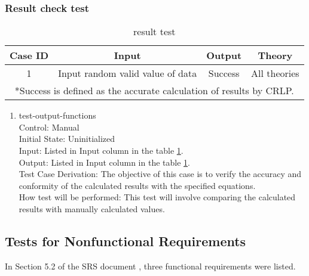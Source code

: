 \documentclass[12pt, titlepage]{article}
\begin{document}
\subsubsection{Result check test}

\begin{table}
    \centering
    \begin{adjustbox}{width=\textwidth}
    \begin{tabularx}{\textwidth}{|c|c|c|c|} %
    \hline
        Case ID & Input & Output & Theory\\
    \hline
        1 & Input random valid value of data & Success & All theories\\
    \hline
    \multicolumn{4}{p{\dimexpr\textwidth-2\tabcolsep\relax}}{*Success is defined as the accurate calculation of results by CRLP.} \\ 
    \end{tabularx}
    \end{adjustbox}
    \caption{result test}
    \label{tab:resulttest}
\end{table}

\begin{enumerate}

    \item test-output-functions \\
    Control: Manual	\\				
    Initial State: Uninitialized\\		
    Input: Listed in Input column in the table \ref{tab:resulttest}.\\			
    Output: Listed in Input column in the table \ref{tab:resulttest}.\\
    Test Case Derivation: The objective of this case is to verify the accuracy and conformity of the calculated results with the specified equations.\\
    How test will be performed: This test will involve comparing the calculated results with manually calculated values.\\
					
\end{enumerate}
\subsection{Tests for Nonfunctional Requirements}

In Section 5.2 of the SRS document \cite{srs}, three functional requirements were listed.
\end{document}

